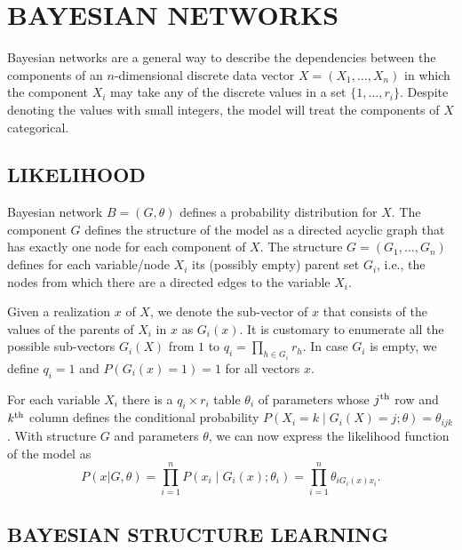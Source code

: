 \section{BAYESIAN NETWORKS}
\label{sec:bns}

Bayesian networks are a general way to describe the dependencies
between the components of an $n$\nobreakdash-dimensional discrete data
vector $X=(X_{1},\ldots,X_{n})$ in which the component $X_{i}$ may
take any of the discrete values in a set $\{1,\ldots,r_{i}\}$.
Despite denoting the values with small integers, the model will treat
the components of $X$ categorical.


\subsection{LIKELIHOOD}
\label{ssec:likelihood}

Bayesian network $B=(G,\theta)$ defines a probability distribution for
$X$. The component $G$ defines the structure of the model as a
directed acyclic graph that has exactly one node for each component of
$X$. The structure $G=(G_{1},\ldots,G_{n})$ defines for each
variable/node $X_{i}$ its (possibly empty) parent set $G_{i}$, i.e.,
the nodes from which there are a directed edges to the variable
$X_{i}$.

Given a realization $x$ of $X$, we denote the sub\nobreakdash-vector
of $x$ that consists of the values of the parents of $X_{i}$ in $x$ as
$G_{i}(x)$. It is customary to enumerate all the possible
sub\nobreakdash-vectors $G_{i}(X)$ from $1$ to $q_{i}=\prod_{h\in
  G_{i}}r_{h}.$ In case $G_{i}$ is empty, we define $q_{i}=1$ and
$P(G_{i}(x)=1)=1$ for all vectors $x$.

For each variable $X_{i}$ there is a $q_{i}\times r_{i}$ table
$\theta_{i}$ of parameters whose $j^{\textnormal{th}}$ row and
$k^{\textnormal{th}}$ column defines the conditional probability
$P(X_{i}=k\mid G_{i}(X)=j;\theta)=\theta_{ijk}$.  With structure $G$
and parameters $\theta$, we can now express the likelihood function of
the model as
\begin{equation}
P(x|G,\theta)=\prod_{i=1}^{n}P(x_{i}\mid G_{i}(x);\theta_{i})=\prod_{i=1}^{n}\theta_{iG_{i}(x)x_{i}}.
\end{equation}



\subsection{BAYESIAN STRUCTURE LEARNING}

